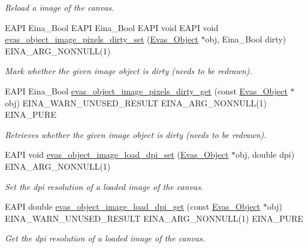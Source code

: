 \begin{DoxyCompactItemize}
\begin{DoxyCompactList}\small\item\em Reload a image of the canvas. \item\end{DoxyCompactList}\item 
EAPI Eina\_\-Bool EAPI Eina\_\-Bool EAPI void EAPI void \hyperlink{group__Evas__Object__Image_gad230eeeb0c6ba49eafd32b20afa314cb}{evas\_\-object\_\-image\_\-pixels\_\-dirty\_\-set} (\hyperlink{group__Evas__Object__Group_ga9e19e6dd1f517a0ba437c0114d3e7c97}{Evas\_\-Object} $\ast$obj, Eina\_\-Bool dirty) EINA\_\-ARG\_\-NONNULL(1)
\begin{DoxyCompactList}\small\item\em Mark whether the given image object is dirty (needs to be redrawn). \item\end{DoxyCompactList}\item 
EAPI Eina\_\-Bool \hyperlink{group__Evas__Object__Image_ga1d9e82da12f7831552fca02b9b313551}{evas\_\-object\_\-image\_\-pixels\_\-dirty\_\-get} (const \hyperlink{group__Evas__Object__Group_ga9e19e6dd1f517a0ba437c0114d3e7c97}{Evas\_\-Object} $\ast$obj) EINA\_\-WARN\_\-UNUSED\_\-RESULT EINA\_\-ARG\_\-NONNULL(1) EINA\_\-PURE
\begin{DoxyCompactList}\small\item\em Retrieves whether the given image object is dirty (needs to be redrawn). \item\end{DoxyCompactList}\item 
EAPI void \hyperlink{group__Evas__Object__Image_ga88a20331cef0267ddc1d00419841580b}{evas\_\-object\_\-image\_\-load\_\-dpi\_\-set} (\hyperlink{group__Evas__Object__Group_ga9e19e6dd1f517a0ba437c0114d3e7c97}{Evas\_\-Object} $\ast$obj, double dpi) EINA\_\-ARG\_\-NONNULL(1)
\begin{DoxyCompactList}\small\item\em Set the dpi resolution of a loaded image of the canvas. \item\end{DoxyCompactList}\item 
EAPI double \hyperlink{group__Evas__Object__Image_ga92a5503085a5c0731bb9c299e7b42f78}{evas\_\-object\_\-image\_\-load\_\-dpi\_\-get} (const \hyperlink{group__Evas__Object__Group_ga9e19e6dd1f517a0ba437c0114d3e7c97}{Evas\_\-Object} $\ast$obj) EINA\_\-WARN\_\-UNUSED\_\-RESULT EINA\_\-ARG\_\-NONNULL(1) EINA\_\-PURE
\begin{DoxyCompactList}\small\item\em Get the dpi resolution of a loaded image of the canvas. \item\end{DoxyCompactList}\item 

\end{DoxyCompactItemize}
